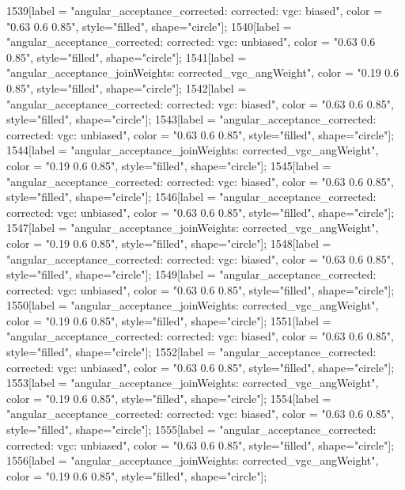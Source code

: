 {	1539[label = "angular_acceptance_corrected\nangacc: corrected\ncsp: vgc\ntrigger: biased", color = "0.63 0.6 0.85", style="filled", shape="circle"];
	1540[label = "angular_acceptance_corrected\nangacc: corrected\ncsp: vgc\ntrigger: unbiased", color = "0.63 0.6 0.85", style="filled", shape="circle"];
	1541[label = "angular_acceptance_joinWeights\nwflag: corrected_vgc_angWeight", color = "0.19 0.6 0.85", style="filled", shape="circle"];
	1542[label = "angular_acceptance_corrected\nangacc: corrected\ncsp: vgc\ntrigger: biased", color = "0.63 0.6 0.85", style="filled", shape="circle"];
	1543[label = "angular_acceptance_corrected\nangacc: corrected\ncsp: vgc\ntrigger: unbiased", color = "0.63 0.6 0.85", style="filled", shape="circle"];
	1544[label = "angular_acceptance_joinWeights\nwflag: corrected_vgc_angWeight", color = "0.19 0.6 0.85", style="filled", shape="circle"];
	1545[label = "angular_acceptance_corrected\nangacc: corrected\ncsp: vgc\ntrigger: biased", color = "0.63 0.6 0.85", style="filled", shape="circle"];
	1546[label = "angular_acceptance_corrected\nangacc: corrected\ncsp: vgc\ntrigger: unbiased", color = "0.63 0.6 0.85", style="filled", shape="circle"];
	1547[label = "angular_acceptance_joinWeights\nwflag: corrected_vgc_angWeight", color = "0.19 0.6 0.85", style="filled", shape="circle"];
	1548[label = "angular_acceptance_corrected\nangacc: corrected\ncsp: vgc\ntrigger: biased", color = "0.63 0.6 0.85", style="filled", shape="circle"];
	1549[label = "angular_acceptance_corrected\nangacc: corrected\ncsp: vgc\ntrigger: unbiased", color = "0.63 0.6 0.85", style="filled", shape="circle"];
	1550[label = "angular_acceptance_joinWeights\nwflag: corrected_vgc_angWeight", color = "0.19 0.6 0.85", style="filled", shape="circle"];
	1551[label = "angular_acceptance_corrected\nangacc: corrected\ncsp: vgc\ntrigger: biased", color = "0.63 0.6 0.85", style="filled", shape="circle"];
	1552[label = "angular_acceptance_corrected\nangacc: corrected\ncsp: vgc\ntrigger: unbiased", color = "0.63 0.6 0.85", style="filled", shape="circle"];
	1553[label = "angular_acceptance_joinWeights\nwflag: corrected_vgc_angWeight", color = "0.19 0.6 0.85", style="filled", shape="circle"];
	1554[label = "angular_acceptance_corrected\nangacc: corrected\ncsp: vgc\ntrigger: biased", color = "0.63 0.6 0.85", style="filled", shape="circle"];
	1555[label = "angular_acceptance_corrected\nangacc: corrected\ncsp: vgc\ntrigger: unbiased", color = "0.63 0.6 0.85", style="filled", shape="circle"];
	1556[label = "angular_acceptance_joinWeights\nwflag: corrected_vgc_angWeight", color = "0.19 0.6 0.85", style="filled", shape="circle"];
}
